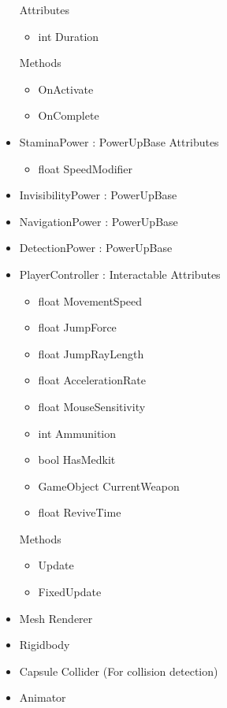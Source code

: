 \documentclass[11pt]{article}
\begin{document}
\begin{itemize}
\newline Attributes
\begin{itemize}
\item int Duration
\end{itemize}
Methods
\begin{itemize}
\item OnActivate
\item OnComplete
\end{itemize}
\item StaminaPower : PowerUpBase
\newline Attributes
\begin{itemize}
\item float SpeedModifier
\end{itemize}
\item InvisibilityPower : PowerUpBase
\item NavigationPower : PowerUpBase
\item DetectionPower : PowerUpBase
\item PlayerController : Interactable
\newline Attributes
\begin{itemize}
\item float MovementSpeed
\item float JumpForce
\item float JumpRayLength
\item float AccelerationRate
\item float MouseSensitivity
\item int Ammunition
\item bool HasMedkit
\item GameObject CurrentWeapon
\item float ReviveTime
\end{itemize}
Methods
\begin{itemize}
\item Update
\item FixedUpdate
\end{itemize}
\item Mesh Renderer
\item Rigidbody
\item Capsule Collider (For collision detection)
\item Animator
\end{itemize}
\end{document}
